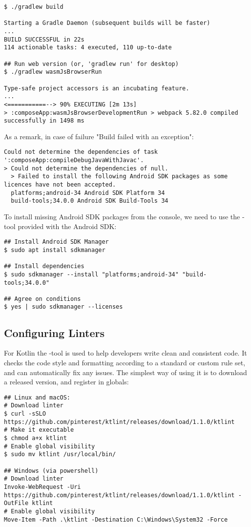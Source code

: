\begin{lstlisting}[language=terminal]
$ ./gradlew build

Starting a Gradle Daemon (subsequent builds will be faster)
...
BUILD SUCCESSFUL in 22s
114 actionable tasks: 4 executed, 110 up-to-date

## Run web version (or, 'gradlew run' for desktop)
$ ./gradlew wasmJsBrowserRun

Type-safe project accessors is an incubating feature.
...
<===========--> 90% EXECUTING [2m 13s]
> :composeApp:wasmJsBrowserDevelopmentRun > webpack 5.82.0 compiled successfully in 1498 ms
\end{lstlisting}


\noindent As a remark, in case of failure "Build failed with an exception":
\begin{lstlisting}[language=terminal]
Could not determine the dependencies of task ':composeApp:compileDebugJavaWithJavac'.
> Could not determine the dependencies of null.
  > Failed to install the following Android SDK packages as some licences have not been accepted.
  platforms;android-34 Android SDK Platform 34
  build-tools;34.0.0 Android SDK Build-Tools 34
\end{lstlisting}

\noindent To install missing Android SDK packages from the console, we need to use the -tool 
provided with the Android SDK:

\begin{lstlisting}[language=terminal]
## Install Android SDK Manager
$ sudo apt install sdkmanager

## Install dependencies
$ sudo sdkmanager --install "platforms;android-34" "build-tools;34.0.0"

## Agree on conditions
$ yes | sudo sdkmanager --licenses
\end{lstlisting}


\subsection{Configuring Linters}

For Kotlin the -tool is used to help developers write clean and consistent code. It checks the code style and 
formatting according to a standard or custom rule set, and can automatically fix any issues. The simplest way of using 
it is to download a released version, and register in globals:

\begin{lstlisting}[language=terminal]
## Linux and macOS:
# Download linter
$ curl -sSLO https://github.com/pinterest/ktlint/releases/download/1.1.0/ktlint
# Make it executable
$ chmod a+x ktlint 
# Enable global visibility
$ sudo mv ktlint /usr/local/bin/

## Windows (via powershell)
# Download linter
Invoke-WebRequest -Uri https://github.com/pinterest/ktlint/releases/download/1.1.0/ktlint -OutFile ktlint
# Enable global visibility
Move-Item -Path .\ktlint -Destination C:\Windows\System32 -Force
\end{lstlisting}

